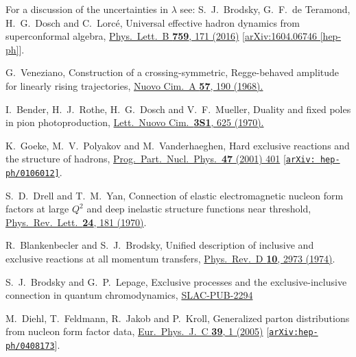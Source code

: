 \documentclass[aps,prl,reprint,groupedaddress, preprintnumbers]{revtex4-1}
\begin{document}
\begin{thebibliography}{50}
  
 For a discussion of the uncertainties in $\lambda$ see:
  S.~J.~Brodsky, G.~F.~de Teramond, H.~G.~Dosch and C.~Lorc\'e,
  Universal effective hadron dynamics from superconformal algebra,
  \href{https://www.sciencedirect.com/science/article/pii/S0370269316302155?via%3Dihub}{Phys.\ Lett.\ B {\bf 759}, 171 (2016)}
  [\href{https://arxiv.org/abs/1604.06746}{arXiv:1604.06746 [hep-ph]}].
  
  
 G.~Veneziano,
 Construction of a crossing-symmetric, Regge-behaved amplitude for linearly rising trajectories,
 \href{https://doi.org/10.1007/BF02824451}{Nuovo Cim.\ A {\bf 57}, 190 (1968).} 
 
 
  I.~Bender, H.~J.~Rothe, H.~G.~Dosch and V.~F.~Mueller,
  Duality and fixed poles in pion photoproduction,
 \href{https://doi.org/10.1007/BF02755475}{Lett.\ Nuovo Cim.\  {\bf 3S1}, 625 (1970).}
 
 
  K.~Goeke, M.~V.~Polyakov and M.~Vanderhaeghen,
  Hard exclusive reactions and the structure of hadrons,
  \href{https://doi.org/10.1016/S0146-6410(01)00158-2}{Prog.\ Part.\ Nucl.\ Phys.\  {\bf 47} (2001) 401}
  [\href{https://arxiv.org/abs/hep-ph/0106012}{\tt arXiv: hep-ph/0106012]}.
  
 
  S.~D.~Drell and T.~M.~Yan,
  Connection of elastic electromagnetic nucleon form factors at large $Q^2$ and deep inelastic structure functions near threshold,
  \href{https://doi.org/10.1103/PhysRevLett.24.181}{Phys.\ Rev.\ Lett.\  {\bf 24}, 181 (1970)}.
  
   
  R.~Blankenbecler and S.~J.~Brodsky,
  Unified description of inclusive and exclusive reactions at all momentum transfers,
  \href{https://doi.org/10.1103/PhysRevD.10.2973}{Phys.\ Rev.\ D {\bf 10}, 2973 (1974)}.
  
  
  S.~J.~Brodsky and G.~P.~Lepage,
  Exclusive processes and the exclusive-inclusive connection in quantum chromodynamics,
  \href{http://www-public.slac.stanford.edu/sciDoc/docMeta.aspx?slacPubNumber=SLAC-PUB-2294}{SLAC-PUB-2294}
  
  
  M.~Diehl, T.~Feldmann, R.~Jakob and P.~Kroll,
  Generalized parton distributions from nucleon form factor data,
  \href{https://doi.org/10.1140/epjc/s2004-02063-4}{Eur.\ Phys.\ J.\ C {\bf 39}, 1 (2005)}
  [\href{https://arxiv.org/abs/hep-ph/0408173}{\tt arXiv:hep-ph/0408173}].  
  

\end{thebibliography}
\end{document}
